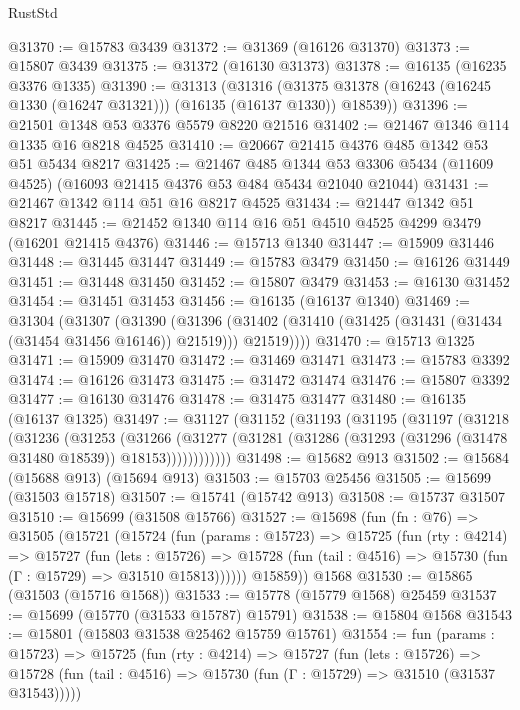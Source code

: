 \begin{lexlean}{RustStd}
\begin{coremodule}
@31370 := @15783 @3439
@31372 := @31369 (@16126 @31370)
@31373 := @15807 @3439
@31375 := @31372 (@16130 @31373)
@31378 := @16135 (@16235 @3376 @1335)
@31390 := @31313
    (@31316 (@31375 @31378 (@16243 (@16245 @1330 (@16247 @31321))) (@16135 (@16137 @1330)) @18539))
@31396 := @21501 @1348 @53 @3376 @5579 @8220 @21516
@31402 := @21467 @1346 @114 @1335 @16 @8218 @4525
@31410 := @20667 @21415 @4376 @485 @1342 @53 @51 @5434 @8217
@31425 := @21467
    @485
    @1344
    @53
    @3306
    @5434
    (@11609 @4525)
    (@16093 @21415 @4376 @53 @484 @5434 @21040 @21044)
@31431 := @21467 @1342 @114 @51 @16 @8217 @4525
@31434 := @21447 @1342 @51 @8217
@31445 := @21452 @1340 @114 @16 @51 @4510 @4525 @4299 @3479 (@16201 @21415 @4376)
@31446 := @15713 @1340
@31447 := @15909 @31446
@31448 := @31445 @31447
@31449 := @15783 @3479
@31450 := @16126 @31449
@31451 := @31448 @31450
@31452 := @15807 @3479
@31453 := @16130 @31452
@31454 := @31451 @31453
@31456 := @16135 (@16137 @1340)
@31469 := @31304
    (@31307
      (@31390
        (@31396 (@31402 (@31410 (@31425 (@31431 (@31434 (@31454 @31456 @16146)) @21519))) @21519))))
@31470 := @15713 @1325
@31471 := @15909 @31470
@31472 := @31469 @31471
@31473 := @15783 @3392
@31474 := @16126 @31473
@31475 := @31472 @31474
@31476 := @15807 @3392
@31477 := @16130 @31476
@31478 := @31475 @31477
@31480 := @16135 (@16137 @1325)
@31497 := @31127
    (@31152
      (@31193
        (@31195
          (@31197
            (@31218
              (@31236
                (@31253
                  (@31266
                    (@31277
                      (@31281 (@31286 (@31293 (@31296 (@31478 @31480 @18539)) @18153))))))))))))
@31498 := @15682 @913
@31502 := @15684 (@15688 @913) (@15694 @913)
@31503 := @15703 @25456
@31505 := @15699 (@31503 @15718)
@31507 := @15741 (@15742 @913)
@31508 := @15737 @31507
@31510 := @15699 (@31508 @15766)
@31527 := @15698
    (fun (fn : @76) =>
    @31505
      (@15721
        (@15724
          (fun (params : @15723) =>
          @15725
            (fun (rty : @4214) =>
            @15727
              (fun (lets : @15726) =>
              @15728 (fun (tail : @4516) => @15730 (fun (Γ : @15729) => @31510 @15813))))))
        @15859))
    @1568
@31530 := @15865 (@31503 (@15716 @1568))
@31533 := @15778 (@15779 @1568) @25459
@31537 := @15699 (@15770 (@31533 @15787) @15791)
@31538 := @15804 @1568
@31543 := @15801 (@15803 @31538 @25462 @15759 @15761)
@31554 := fun (params : @15723) =>
  @15725
    (fun (rty : @4214) =>
    @15727
      (fun (lets : @15726) =>
      @15728 (fun (tail : @4516) => @15730 (fun (Γ : @15729) => @31510 (@31537 @31543)))))

\end{coremodule}
\end{lexlean}
